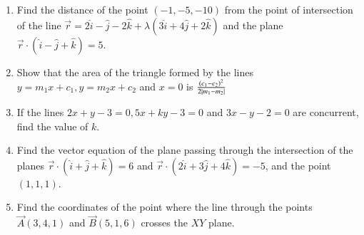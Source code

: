\begin{enumerate}[label=\thesubsection.\arabic*, ref=\thesubsection.\theenumi]
\item Find the distance of the point $(-1, -5, -10)$ from the point of intersection of the line $\overrightarrow{r}=2\hat{i}-\hat{j}-2\hat{k}+\lambda(3\hat{i}+4\hat{j}+2\hat{k})$ and the plane $\overrightarrow{r}\cdot(\hat{i}-\hat{j}+\hat{k})=5$.
\item Show that the area of the triangle formed by the lines $y=m_1x+c_1,  y=m_2x+c_2$ and $x=0$ is $\frac{\left(c_1-c_2\right)^2}{2\left\vert m_1-m_2\right\vert}$
\item If the lines $2x+y-3=0,  5x+ky-3=0$ and $3x-y-2=0$ are concurrent,  find the value of $k$.
\item Find the vector equation of the plane passing through the intersection of the planes $\overrightarrow{r} \cdot (\hat{i} +\hat{j} +\hat{k})=6$ and $\overrightarrow{r} \cdot (2\hat{i} +3\hat{j} +4\hat{k})=-5$,  and the point $(1,  1,  1)$.
\item Find the coordinates of the point where the line through the points $\vec{A}(3, 4, 1)$ and $\vec{B}(5,  1,  6)$ crosses the $XY$ plane.
\end{enumerate}
